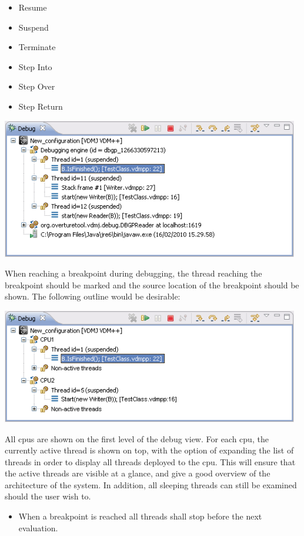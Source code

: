 \documentclass{overturerep}
\begin{document}
\begin{itemize}
	\item Resume
	\item Suspend
	\item Terminate
	\item Step Into
	\item Step Over
	\item Step Return
\end{itemize}

\includegraphics[width=369pt]{figures/stackTrace.png}

When reaching a breakpoint during debugging, the thread reaching the breakpoint should be marked and the source location of the breakpoint should be shown. The following outline would be desirable:

\includegraphics[width=369pt]{figures/NewDebugLook.png}

All cpus are shown on the first level of the debug view. For each cpu, the currently active thread is shown on top, with the option of expanding the list of threads in order to display all threads deployed to the cpu. This will ensure that the active threads are visible at a glance, and give a good overview of the architecture of the system. In addition, all sleeping threads can still be examined should the user wish to. 

\begin{itemize}
	\item When a breakpoint is reached all threads shall stop before the next evaluation.
\end{itemize}
\end{document}
